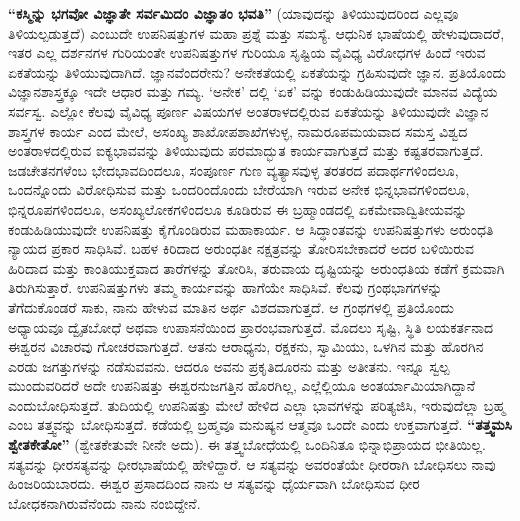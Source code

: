 \textbf{“ಕಸ್ಮಿನ್ನು ಭಗವೋ ವಿಜ್ಞಾತೇ ಸರ್ವಮಿದಂ ವಿಜ್ಞಾತಂ ಭವತಿ”} (ಯಾವುದನ್ನು ತಿಳಿಯುವುದರಿಂದ ಎಲ್ಲವೂ ತಿಳಿಯಲ್ಪಡುತ್ತದೆ) ಎಂಬುದೇ ಉಪನಿಷತ್ತುಗಳ ಮಹಾ ಪ್ರಶ್ನೆ ಮತ್ತು ಸಮಸ್ಯೆ. ಆಧುನಿಕ ಭಾಷೆಯಲ್ಲಿ ಹೇಳುವುದಾದರೆ, ಇತರ ಎಲ್ಲ ದರ್ಶನಗಳ ಗುರಿಯಂತೇ ಉಪನಿಷತ್ತುಗಳ ಗುರಿಯೂ ಸೃಷ್ಟಿಯ ವೈವಿಧ್ಯ ವಿರೋಧಗಳ ಹಿಂದೆ ಇರುವ ಏಕತೆಯನ್ನು ತಿಳಿಯುವುದಾಗಿದೆ. ಜ್ಞಾನವೆಂದರೇನು? ಅನೇಕತೆಯಲ್ಲಿ ಏಕತೆಯನ್ನು ಗ್ರಹಿಸುವುದೇ ಜ್ಞಾನ. ಪ್ರತಿಯೊಂದು ವಿಜ್ಞಾನಶಾಸ್ತ್ರಕ್ಕೂ ಇದೇ ಆಧಾರ ಮತ್ತು ಗಮ್ಯ. ‘ಅನೇಕ’ ದಲ್ಲಿ ‘ಏಕ’ ವನ್ನು ಕಂಡುಹಿಡಿಯುವುದೇ ಮಾನವ ವಿದ್ಯೆಯ ಸರ್ವಸ್ವ. ಎಲ್ಲೋ ಕೆಲವು ವೈವಿಧ್ಯ ಪೂರ್ಣ ವಿಷಯಗಳ ಅಂತರಾಳದಲ್ಲಿರುವ ಏಕತೆಯನ್ನು ತಿಳಿಯುವುದೇ ವಿಜ್ಞಾನ ಶಾಸ್ತ್ರಗಳ ಕಾರ್ಯ ಎಂದ ಮೇಲೆ, ಅಸಂಖ್ಯ ಶಾಖೋಪಶಾಖೆಗಳುಳ್ಳ, ನಾಮರೂಪಮಯವಾದ ಸಮಸ್ತ ವಿಶ್ವದ ಅಂತರಾಳದಲ್ಲಿರುವ ಐಕ್ಯಭಾವವನ್ನು ತಿಳಿಯುವುದು ಪರಮಾದ್ಭುತ ಕಾರ್ಯವಾಗುತ್ತದೆ ಮತ್ತು ಕಷ್ಟತರವಾಗುತ್ತದೆ. ಜಡಚೇತನಗಳೆಂಬ ಭೇದಭಾವದಿಂದಲೂ, ಸಂಪೂರ್ಣ ಗುಣ ವ್ಯತ್ಯಾಸವುಳ್ಳ ತರತರದ ಪದಾರ್ಥಗಳಿಂದಲೂ, ಒಂದನ್ನೊಂದು ವಿರೋಧಿಸುವ ಮತ್ತು ಒಂದರಿಂದೊಂದು ಬೇರೆಯಾಗಿ ಇರುವ ಅನೇಕ ಭಿನ್ನಭಾವಗಳಿಂದಲೂ, ಭಿನ್ನರೂಪಗಳಿಂದಲೂ, ಅಸಂಖ್ಯಲೋಕಗಳಿಂದಲೂ ಕೂಡಿರುವ ಈ ಬ್ರಹ್ಮಾಂಡದಲ್ಲಿ ಏಕಮೇವಾದ್ವಿತೀಯವನ್ನು ಕಂಡುಹಿಡಿಯುವುದೇ ಉಪನಿಷತ್ತು ಕೈಗೊಂಡಿರುವ ಮಹಾಕಾರ್ಯ. ಆ ಸಿದ್ಧಾಂತವನ್ನು ಉಪನಿಷತ್ತುಗಳು ಅರುಂಧತಿ ನ್ಯಾಯದ ಪ್ರಕಾರ ಸಾಧಿಸಿವೆ. ಬಹಳ ಕಿರಿದಾದ ಅರುಂಧತೀ ನಕ್ಷತ್ರವನ್ನು ತೋರಿಸ\-ಬೇಕಾದರೆ ಅದರ ಬಳಿಯಿರುವ ಹಿರಿದಾದ ಮತ್ತು ಕಾಂತಿಯುಕ್ತವಾದ ತಾರೆಗಳನ್ನು ತೋರಿಸಿ, ತರುವಾಯ ದೃಷ್ಟಿಯನ್ನು ಅರುಂಧತಿಯ ಕಡೆಗೆ ಕ್ರಮವಾಗಿ ತಿರುಗಿಸುತ್ತಾರೆ. ಉಪನಿಷತ್ತುಗಳು ತಮ್ಮ ಕಾರ್ಯವನ್ನು ಹಾಗೆಯೇ ಸಾಧಿಸಿವೆ. ಕೆಲವು ಗ್ರಂಥಭಾಗಗಳನ್ನು ತೆಗೆದುಕೊಂಡರೆ ಸಾಕು, ನಾನು ಹೇಳುವ ಮಾತಿನ ಅರ್ಥ ವಿಶದವಾಗುತ್ತದೆ. ಆ ಗ್ರಂಥಗಳಲ್ಲಿ ಪ್ರತಿಯೊಂದು ಅಧ್ಯಾಯವೂ ದ್ವೈತಬೋಧೆ ಅಥವಾ ಉಪಾಸನೆಯಿಂದ ಪ್ರಾರಂಭವಾಗುತ್ತದೆ. ಮೊದಲು ಸೃಷ್ಟಿ, ಸ್ಥಿತಿ ಲಯಕರ್ತನಾದ ಈಶ್ವರನ ವಿಚಾರವು ಗೋಚರವಾಗುತ್ತದೆ. ಆತನು ಆರಾಧ್ಯನು, ರಕ್ಷಕನು, ಸ್ವಾಮಿಯು, ಒಳಗಿನ ಮತ್ತು ಹೊರಗಿನ ಎರಡು ಜಗತ್ತುಗಳನ್ನು ನಡೆಸುವವನು. ಆದರೂ ಅವನು ಪ್ರಕೃತಿದೂರನು ಮತ್ತು ಅತೀತನು. ಇನ್ನೂ ಸ್ವಲ್ಪ ಮುಂದುವರಿದರೆ ಅದೇ ಉಪನಿಷತ್ತು ಈಶ್ವರನು\break ಜಗತ್ತಿನ ಹೊರಗಿಲ್ಲ, ಎಲ್ಲೆಲ್ಲಿಯೂ ಅಂತರ್ಯಾಮಿಯಾಗಿದ್ದಾನೆ ಎಂದು\break ಬೋಧಿಸು\-ತ್ತದೆ. ತುದಿಯಲ್ಲಿ ಉಪನಿಷತ್ತು ಮೇಲೆ ಹೇಳಿದ ಎಲ್ಲಾ ಭಾವಗಳನ್ನು ಪರಿತ್ಯಜಿಸಿ, ಇರುವುದೆಲ್ಲಾ ಬ್ರಹ್ಮ ಎಂಬ ತತ್ತ್ವವನ್ನು ಬೋಧಿಸುತ್ತದೆ. ಕಡೆಯಲ್ಲಿ ಬ್ರಹ್ಮವೂ ಮನುಷ್ಯನ ಆತ್ಮವೂ ಒಂದೇ ಎಂದು ಉಕ್ತವಾಗುತ್ತದೆ. \textbf{“ತತ್ತ್ವಮಸಿ\general{\break } ಶ್ವೇತಕೇತೋ”} (ಶ್ವೇತಕೇತುವೇ ನೀನೇ ಅದು). ಈ ತತ್ತ್ವಬೋಧೆಯಲ್ಲಿ ಒಂದಿನಿತೂ ಭಿನ್ನಾಭಿಪ್ರಾಯದ ಭೀತಿಯಿಲ್ಲ. ಸತ್ಯವನ್ನು ಧೀರಸತ್ಯವನ್ನು ಧೀರಭಾಷೆಯಲ್ಲಿ ಹೇಳಿದ್ದಾರೆ. ಆ ಸತ್ಯವನ್ನು ಅವರಂತೆಯೇ ಧೀರರಾಗಿ ಬೋಧಿಸಲು ನಾವು ಹಿಂಜರಿಯಬಾರದು. ಈಶ್ವರ ಪ್ರಸಾದದಿಂದ ನಾನು ಆ ಸತ್ಯವನ್ನು ಧೈರ್ಯವಾಗಿ ಬೋಧಿಸುವ ಧೀರ ಬೋಧಕನಾಗಿರುವೆನೆಂದು ನಾನು ನಂಬಿದ್ದೇನೆ.


